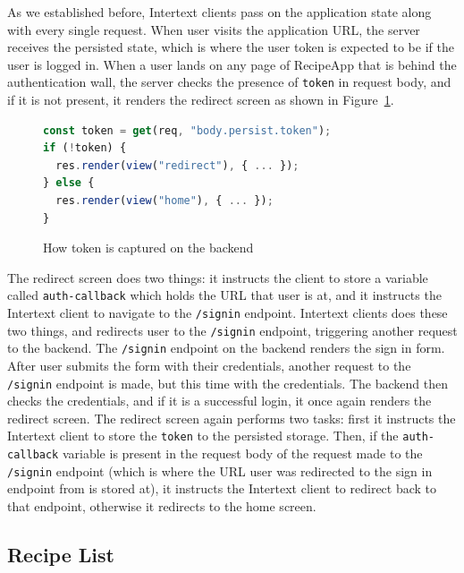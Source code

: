 As we established before, Intertext clients pass on the application state along with every single request. When user visits the application URL, the server receives the persisted state, which is where the user token is expected to be if the user is logged in. When a user lands on any page of RecipeApp that is behind the authentication wall, the server checks the presence of \texttt{token} in request body, and if it is not present, it renders the redirect screen as shown in Figure~\ref{fig:token_capture}. 

\begin{figure}[htb]
\begin{minipage}{\linewidth}
\begin{lstlisting}[language=javascript]
const token = get(req, "body.persist.token");
if (!token) {
  res.render(view("redirect"), { ... });
} else {
  res.render(view("home"), { ... });
}
\end{lstlisting}
\end{minipage}
\caption{How token is captured on the backend}%
\label{fig:token_capture}%
\end{figure}

The redirect screen does two things: it instructs the client to store a variable called \texttt{auth-callback} which holds the URL that user is at, and it instructs the Intertext client to navigate to the \texttt{/signin} endpoint. Intertext clients does these two things, and redirects user to the \texttt{/signin} endpoint, triggering another request to the backend. The \texttt{/signin} endpoint on the backend renders the sign in form. After user submits the form with their credentials, another request to the \texttt{/signin} endpoint is made, but this time with the credentials. The backend then checks the credentials, and if it is a successful login, it once again renders the redirect screen. The redirect screen again performs two tasks: first it instructs the Intertext client to store the \texttt{token} to the persisted storage. Then, if the \texttt{auth-callback} variable is present in the request body of the request made to the \texttt{/signin} endpoint (which is where the URL user was redirected to the sign in endpoint from is stored at), it instructs the Intertext client to redirect back to that endpoint, otherwise it redirects to the home screen.

\subsection{Recipe List}

